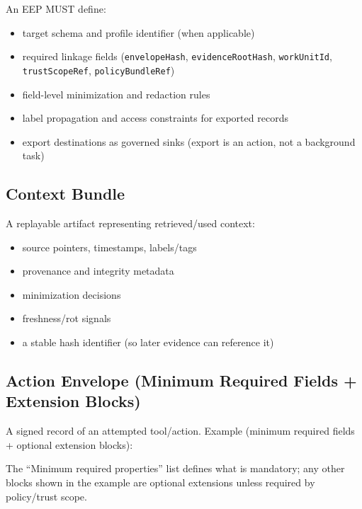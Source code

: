 \documentclass[11pt]{article}
\begin{document}
An EEP MUST define:

\begin{itemize}
\tightlist
\item
  target schema and profile identifier (when applicable)
\item
  required linkage fields (\texttt{envelopeHash},
  \texttt{evidenceRootHash}, \texttt{workUnitId},
  \texttt{trustScopeRef}, \texttt{policyBundleRef})
\item
  field-level minimization and redaction rules
\item
  label propagation and access constraints for exported records
\item
  export destinations as governed sinks (export is an action, not a
  background task)
\end{itemize}

\hypertarget{context-bundle}{%
\subsection{Context Bundle}\label{context-bundle}}

A replayable artifact representing retrieved/used context:

\begin{itemize}
\tightlist
\item
  source pointers, timestamps, labels/tags
\item
  provenance and integrity metadata
\item
  minimization decisions
\item
  freshness/rot signals
\item
  a stable hash identifier (so later evidence can reference it)
\end{itemize}

\hypertarget{action-envelope-minimum-schema}{%
\subsection{Action Envelope (Minimum Required Fields + Extension Blocks)}\label{action-envelope-minimum-schema}}

A signed record of an attempted tool/action. Example (minimum required fields + optional extension blocks):

The ``Minimum required properties'' list defines what is mandatory; any other blocks shown in the example are optional extensions unless required by policy/trust scope.
\end{document}

